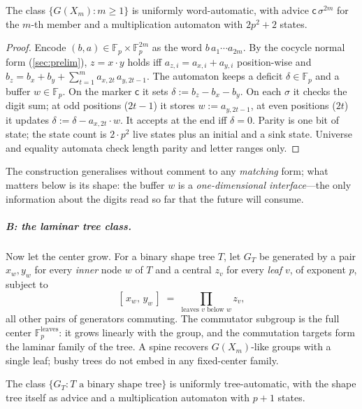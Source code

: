 \documentclass[a4paper,UKenglish,autoref,anonymous]{lipics-v2021}
\newcommand{\Fp}{\mathbb{F}_p}
\begin{document}
\begin{proposition}
\label{prop:warmA}
The class $\{G(X_m) : m \ge 1\}$ is uniformly word-automatic, with advice
$\mathsf{c}\,\sigma^{2m}$ for the $m$-th member and a multiplication
automaton with $2p^2 + 2$ states.
\end{proposition}

\begin{proof}
Encode $(b, a) \in \Fp \times \Fp^{2m}$ as the word $b\, a_1 \cdots
a_{2m}$. By the cocycle normal form (\autoref{sec:prelim}), $z = x \cdot
y$ holds iff $a_{z,i} = a_{x,i} + a_{y,i}$ position-wise and $b_z = b_x +
b_y + \sum_{t=1}^{m} a_{x,2t}\, a_{y,2t-1}$. The automaton keeps a deficit
$\delta \in \Fp$ and a buffer $w \in \Fp$. On the marker $\mathsf{c}$ it
sets $\delta := b_z - b_x - b_y$. On each $\sigma$ it checks the digit
sum; at odd positions ($2t{-}1$) it stores $w := a_{y,2t-1}$, at even
positions ($2t$) it updates $\delta := \delta - a_{x,2t} \cdot w$. It
accepts at the end iff $\delta = 0$. Parity is one bit of state; the
state count is $2 \cdot p^2$ live states plus an initial and a sink
state. Universe and equality automata check length parity and letter
ranges only.
\end{proof}

The construction generalises without comment to any \emph{matching}
form; what matters below is its shape: the buffer $w$ is a
\emph{one-dimensional interface}---the only information about the digits
read so far that the future will consume.

\subparagraph*{B: the laminar tree class.}
Now let the center grow. For a binary shape tree $T$, let $G_T$ be
generated by a pair $x_w, y_w$ for every \emph{inner} node $w$ of $T$ and
a central $z_v$ for every \emph{leaf} $v$, of exponent $p$, subject to
\[
  [\,x_w,\, y_w\,] \;=\; \prod_{\text{leaves } v \text{ below } w} z_v,
\]
all other pairs of generators commuting. The commutator subgroup is the
full center $\Fp^{\text{leaves}}$: it grows linearly with the group, and
the commutation targets form the laminar family of the tree. A spine
recovers $G(X_m)$-like groups with a single leaf; bushy trees do not
embed in any fixed-center family.

\begin{proposition}
\label{prop:warmB}
The class $\{G_T : T \text{ a binary shape tree}\}$ is uniformly
tree-automatic, with the shape tree itself as advice and a multiplication
automaton with $p + 1$ states.
\end{proposition}
\end{document}
